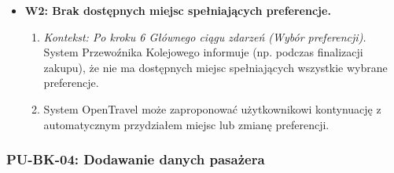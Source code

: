 \documentclass[a4paper,12pt]{article}
\begin{document}
\begin{itemize}
\begin{itemize}
\begin{enumerate}
\end{enumerate}
\item \textbf{W2: Brak dostępnych miejsc spełniających preferencje.}
\begin{enumerate}
\item \textit{Kontekst: Po kroku 6 Głównego ciągu zdarzeń (Wybór preferencji).} System Przewoźnika Kolejowego informuje (np. podczas finalizacji zakupu), że nie ma dostępnych miejsc spełniających wszystkie wybrane preferencje.
\item System OpenTravel może zaproponować użytkownikowi kontynuację z automatycznym przydziałem miejsc lub zmianę preferencji.
\end{enumerate}
\end{itemize}
\end{itemize}

\subsubsection{PU-BK-04: Dodawanie danych pasażera}
\end{document}
